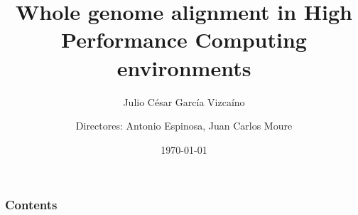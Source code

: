 \documentclass{beamer}
\begin{document}
\title[]{Whole genome alignment in High Performance Computing environments}
\author[Julio García]{Julio César García Vizcaíno \and Directores: Antonio Espinosa, Juan Carlos Moure}
\date[\today]{\today}

\begin{frame}
  \titlepage
\end{frame}
\begin{frame}
  \frametitle{Contents}\tableofcontents
\end{frame}
\end{document}
